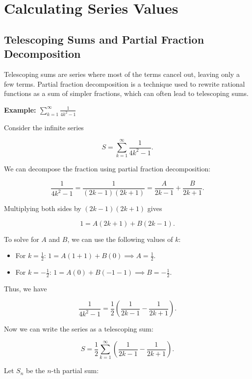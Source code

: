 \newpage
\section{Calculating Series Values}

\subsection{Telescoping Sums and Partial Fraction Decomposition}

Telescoping sums are series where most of the terms cancel out, leaving only a few terms. Partial fraction decomposition is a technique used to rewrite rational functions as a sum of simpler fractions, which can often lead to telescoping sums.
\vspace{\baselineskip}

\textbf{Example: \(\sum_{k=1}^{\infty} \frac{1}{4k^2 - 1}\)}
\vspace{\baselineskip}

Consider the infinite series

\[
S = \sum_{k=1}^{\infty} \frac{1}{4k^2 - 1}.
\]

We can decompose the fraction using partial fraction decomposition:

\[
\frac{1}{4k^2 - 1} = \frac{1}{(2k - 1)(2k + 1)} = \frac{A}{2k - 1} + \frac{B}{2k + 1}.
\]

Multiplying both sides by \((2k - 1)(2k + 1)\) gives

\[
1 = A(2k + 1) + B(2k - 1).
\]

To solve for \(A\) and \(B\), we can use the following values of \(k\):

\begin{itemize}[label=\(-\)]
    \item For \(k = \frac{1}{2}\): \(1 = A(1 + 1) + B(0) \implies A = \frac{1}{2}\).
    \item For \(k = -\frac{1}{2}\): \(1 = A(0) + B(-1 - 1) \implies B = -\frac{1}{2}\).
\end{itemize}

Thus, we have

\[
\frac{1}{4k^2 - 1} = \frac{1}{2} \left( \frac{1}{2k - 1} - \frac{1}{2k + 1} \right).
\]

Now we can write the series as a telescoping sum:

\[
S = \frac{1}{2} \sum_{k=1}^{\infty} \left( \frac{1}{2k - 1} - \frac{1}{2k + 1} \right).
\]

Let \(S_n\) be the \(n\)-th partial sum:

